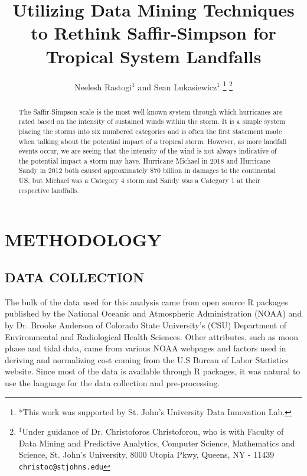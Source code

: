 \documentclass[letterpaper, 10 pt, conference]{ieeeconf}  %
\title{\LARGE \bf
Utilizing Data Mining Techniques to Rethink Saffir-Simpson for Tropical System Landfalls
}
\author{Neelesh Rastogi$^{1}$ and Sean Lukasiewicz$^{1}$%
\thanks{*This work was supported by St. John's University Data Innovation Lab.}%
\thanks{$^{1}$Under guidance of Dr. Christoforos Christoforou, who is with Faculty of Data Mining and Predictive Analytics, Computer Science, Mathematics and Science,
        St. John's University, 8000 Utopia Pkwy, Queens, NY - 11439
        {\tt\small christoc@stjohns.edu}}%
}
\begin{document}
\maketitle
\thispagestyle{empty}
\pagestyle{empty}


\begin{abstract}
The Saffir-Simpson scale is the most well known system through which hurricanes are rated based on the intensity of sustained winds within the storm. It is a simple system placing the storms into six numbered categories and is often the first statement made when talking about the potential impact of a tropical storm. However, as more landfall events occur, we are seeing that the intensity of the wind is not always indicative of the potential impact a storm may have. Hurricane Michael in 2018 and Hurricane Sandy in 2012 both caused approximately \$70 billion in damages to the continental US, but Michael was a Category 4 storm and Sandy was a Category 1 at their respective landfalls.

\end{abstract}

\section{METHODOLOGY}

\subsection{DATA COLLECTION}
The bulk of the data used for this analysis came from open source R packages published by the National Oceanic and Atmospheric Administration (NOAA) and by Dr. Brooke Anderson of Colorado State University’s (CSU) Department of Environmental and Radiological Health Sciences. Other attributes, such as moon phase and tidal data, came from various NOAA webpages and factors used in deriving and normalizing cost coming from the U.S Bureau of Labor Statistics website. Since most of the data is available through R packages, it was natural to use the language for the data collection and pre-processing.
\end{document}
